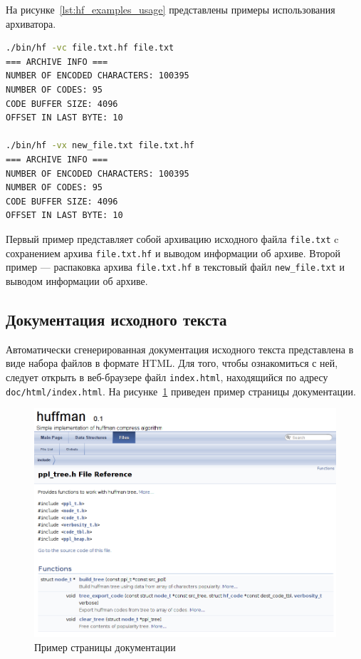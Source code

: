 На рисунке~\ref{lst:hf_examples_usage} представлены примеры использования
архиватора.

\begin{lstlisting}[basicstyle=\scriptsize\ttfamily,
                   numberstyle=\scriptsize\ttfamily,
                   xleftmargin=7mm,
                   language=bash,
                   caption=Примеры использования архиватора,
                   label=lst:hf_examples_usage]
./bin/hf -vc file.txt.hf file.txt 
=== ARCHIVE INFO ===
NUMBER OF ENCODED CHARACTERS: 100395
NUMBER OF CODES: 95
CODE BUFFER SIZE: 4096
OFFSET IN LAST BYTE: 10

./bin/hf -vx new_file.txt file.txt.hf
=== ARCHIVE INFO ===
NUMBER OF ENCODED CHARACTERS: 100395
NUMBER OF CODES: 95
CODE BUFFER SIZE: 4096
OFFSET IN LAST BYTE: 10
\end{lstlisting}

Первый пример представляет собой архивацию исходного файла \texttt{file.txt}
c сохранением архива \texttt{file.txt.hf} и выводом информации об архиве.
Второй пример --- распаковка архива \texttt{file.txt.hf}
в текстовый файл \texttt{new\_file.txt} и выводом информации об архиве.

\subsection{Документация исходного текста}

Автоматически сгенерированная документация исходного текста представлена
в виде набора файлов в формате HTML. Для того, чтобы ознакомиться с ней,
следует открыть в веб-браузере файл \texttt{index.html},
находящийся по адресу \texttt{doc/html/index.html}.
На рисунке~\ref{pic:documentation} приведен пример страницы документации.

\begin{figure}[h!]
  \centering
  \includegraphics[width=150mm]{pic/documentation.png}
  \caption{Пример страницы документации}
  \label{pic:documentation}
\end{figure}
